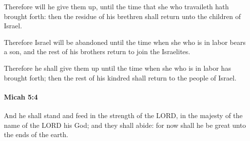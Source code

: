 			\begin{versebox}
					\item[BHS] 
					\item[LXX] 
					\item[ASV] Therefore will he give them up, until the time that she who travaileth hath brought forth: then the residue of his brethren shall return unto the children of Israel.
					\item[NIV] Therefore Israel will be abandoned until the time when she who is in labor bears a son, and the rest of his brothers return to join the Israelites.
					\item[NRSV] Therefore he shall give them up until the time when she who is in labor has brought forth; then the rest of his kindred shall return to the people of Israel.
			\end{versebox}

		\paragraph{Micah 5:4} %
			\label{MICAH-5-4}

			And he shall stand and feed in the strength of the LORD, in the majesty of the name of the LORD his God; and they shall abide: for now shall he be great unto the ends of the earth.

